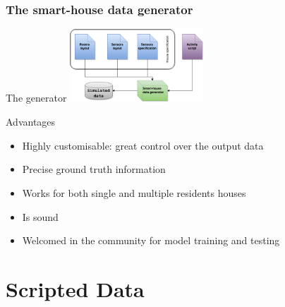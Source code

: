 \documentclass[10pt]{beamer}
\begin{document}
\begin{frame}[plain]
  \frametitle{The smart-house data generator}

  \begin{block}{The generator}
      \centering\noindent\includegraphics[width=5cm]{./gfx/gen}
  \end{block}

  \begin{block}{Advantages}
  \begin{itemize}
    \item Highly customisable: great control over the output data
    \item Precise ground truth information
    \item Works for both single and multiple residents houses
    \item Is sound
    \item Welcomed in the community for model training and testing
  \end{itemize}
  \end{block}

\end{frame}


\section{Scripted Data}
\end{document}
